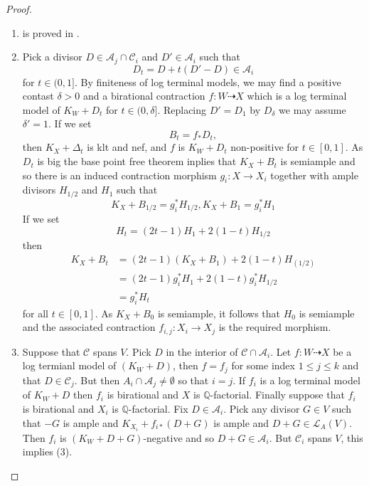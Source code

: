 \documentclass{article}
\begin{document}
\begin{proof}
  \begin{enumerate}
    \item is proved in \cite{birkarExistenceMinimalModels2009}.
    \item Pick a divisor $D \in \mathcal{A}_{j} \cap \mathcal{C}_{i}$ and $D' \in \mathcal{A}_{i}$ such that
      \[
        D_{t}=D+t(D'-D) \in \mathcal{A}_{i} 
      \]
      for $t \in (0,1]$. By finiteness of log terminal models, we may find a positive contast $\delta>0 $ and a birational contraction $
      f: W \dashrightarrow X$ which is a log terminal model of $K_{W}+D_{t}$ for  $t \in (0,\delta]$. Replacing $D'=D_{1}$ by $D_{\delta}$ we may assume $\delta'=1$. If we set 
      \[
        B_{t}=f_*D_{t}
      ,\]
      then $K_{X}+\Delta_{t}$ is klt and nef, and $f$ is $K_{W}+D_{t}$ non-positive for $t \in [0,1]$. As $D_{t}$ is big the base point free theorem inplies that $K_{X}+B_{t}$ is semiample and so there is an induced contraction morphism $g_i: X \to X_{i}$ together with ample divisors $H_{1/2}$ and $H_{1}$ such that 
      \[
        K_{X}+B_{1/2} =g_{i}^*H_{1/2},  K_{X}+B_{1} =g_{i}^*H_{1}
      \]
      If we set 
      \[
        H_{t}=(2t-1)H_1 +2(1-t)H_{1/2}
      \]
      then 
      \[
        \begin{aligned}
          K_{X}+B_{t}&=(2t-1)(K_{X}+B_{1})+2(1-t)H_{(1/2)}\\
                     &=(2t-1)g_{i}^*H_{1}+2(1-t)g_{i}^*H_{1/2}\\ 
                     &=g_{i}^*H_{t}
        \end{aligned}
      \]
      for all $t \in [0,1]$. As $K_{X}+B_{0}$ is semiample, it follows that $H_{0}$ is semiample and the associated contraction $f_{i,j}:X_{i}\to X_{j}$ is the required morphism.  
    \item Suppose that $\mathcal{C}$ spans $V$. Pick $D$ in the interior of $\mathcal{C} \cap \mathcal{A}_{i}$. Let $f:W \dashrightarrow  X$ be a log termianl model of $(K_{W}+D)$, then $f=f_{j}$ for some index $1\leqslant j\leqslant k$ and that $D \in \mathcal{C}_{j}$. But then $A_{i} \cap \mathcal{A}_{j}\neq \emptyset$ so that $i=j$. If $f_{i}$ is a log terminal model of $K_{W}+D$ then $f_{i}$ is birational and $X$ is $\mathbb{Q}$-factorial. Finally suppose that $f_{i}$ is birational and $X_{i}$ is $\mathbb{Q}$-factorial. Fix $D \in \mathcal{A}_{i}$. Pick any divisor $G \in V$ such that $-G$ is ample and $K_{X_{i}}+
f_{i*}(D+G)$ is ample and $D+G \in \mathcal{L}_{A}(V)$. Then $f_{i}$ is $(K_{W}+D+G)$-negative and so $D+G \in \mathcal{A}_{i}$. But $\mathcal{C}_{i}$ spans $V$, this implies (3).

\end{enumerate}
\end{proof}
\end{document}
